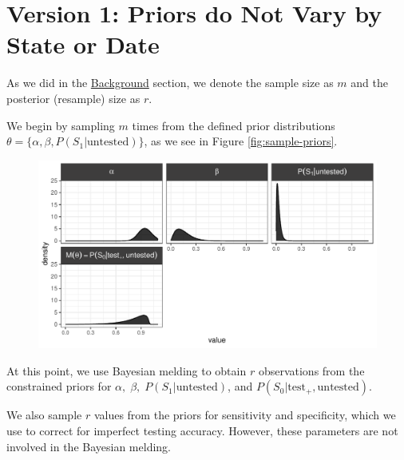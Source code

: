 \documentclass[12pt,twoside]{smiththesis}
\begin{document}
\hypertarget{version-1-priors-do-not-vary-by-state-or-date}{%
\section{Version 1: Priors do Not Vary by State or Date}\label{version-1-priors-do-not-vary-by-state-or-date}}

As we did in the \protect\hyperlink{sampling}{Background} section, we denote the sample size as \(m\) and the posterior (resample) size as \(r\).

We begin by sampling \(m\) times from the defined prior distributions \(\theta = \Big\{ \alpha, \beta, P(S_1| \text{untested})\Big\}\), as we see in Figure \ref{fig:sample-priors}.
\begin{figure}
\includegraphics[width=1\linewidth]{thesis_files/figure-latex/unnamed-chunk-68-1} \caption{\label{fig:sample-priors}}\label{fig:unnamed-chunk-68}
\end{figure}
At this point, we use Bayesian melding to obtain \(r\) observations from the constrained priors for \(\alpha, \; \beta, \;P(S_1|\text{untested})\), and \(P(S_0|\text{test}_+,\text{untested})\).

We also sample \(r\) values from the priors for sensitivity and specificity, which we use to correct for imperfect testing accuracy. However, these parameters are not involved in the Bayesian melding.
\end{document}
